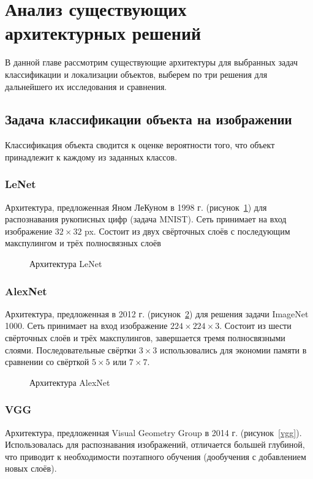 \newpage
\section{Анализ существующих архитектурных решений}
В данной главе рассмотрим существующие архитектуры для выбранных задач классификации и локализации объектов, выберем по три решения для дальнейшего их исследования и сравнения.
\subsection{Задача классификации объекта на изображении}
Классификация объекта сводится к оценке вероятности того, что объект принадлежит к каждому из заданных классов.
\subsubsection{LeNet}
Архитектура, предложенная Яном ЛеКуном в 1998 г. \cite{classifications} (рисунок~\ref{lenet}) для распознавания рукописных цифр (задача MNIST). Сеть принимает на вход изображение $32\times32$ px. Состоит из двух свёрточных слоёв с последующим макспулингом и трёх полносвязных слоёв

\begin{figure}[H]
	\caption{Архитектура LeNet}
	\label{lenet}
\end{figure}

\subsubsection{AlexNet}
Архитектура, предложенная в 2012 г. \cite{classifications} (рисунок~\ref{alexnet}) для решения задачи ImageNet 1000.  Сеть принимает на вход изображение $224\times224\times3$. Состоит из шести свёрточных слоёв и трёх макспулингов, завершается тремя полносвязными слоями. Последовательные свёртки $3\times3$ использовались для экономии памяти в сравнении со свёрткой $5\times5$ или $7\times7$.


\begin{figure}[H]
	\caption{Архитектура AlexNet}
	\label{alexnet}
\end{figure}

\subsubsection{VGG}
Архитектура, предложенная Visual Geometry Group в 2014 г. \cite{classifications} (рисунок~\ref{vgg}). Использовалась для распознавания изображений, отличается большей глубиной, что приводит к необходимости поэтапного обучения (дообучения с добавлением новых слоёв). 

